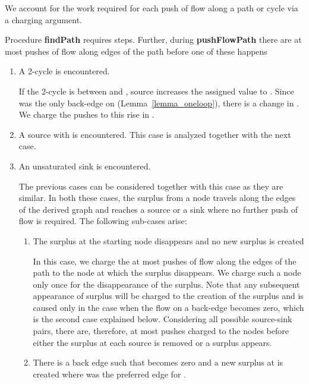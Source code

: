\documentclass[11pt]{article}
\newenvironment{proof}{\par\noindent{\bf Proof:}}{\mbox{}\hfill\\}
\newcounter{rem}
\newcommand{\ignore}[1]{ }
\begin{document}
\begin{proof}
We account for the work required for each push of flow along a path or cycle
via a charging argument. 
\ignore{
We will use the following key fact:\\
{\bf Fact 1:} If the flow on edge   at valuation
 is reduced to zero, 
then  occurs as a back edge only when 
the value of  rises to .\\
This fact follows due to the fact the  is monotonically non-decreasing.
Furthermore, flow can only be pushed on edge  at an increased valuation 
and an edge
is termed a back-edge when there is flow on the edge that has been pushed at a valuation of .
}
Procedure {\bf findPath} requires  steps.
Further, during {\bf pushFlowPath}
there are at most  pushes of flow along edges of the path
before one of these happens
\begin{enumerate}
\item
A 2-cycle  is encountered.

If the 2-cycle is between  and , source  increases the
assigned value  to . Since  was the only back-edge
on  (Lemma~\ref{lemma_oneloop}), there is a change in . We charge the  pushes 
to this rise in .

\item
A source with  is encountered. This case is analyzed together with the
next case.


\item
An unsaturated sink is encountered.

The previous cases can be considered together with this case as they are similar. In both 
these cases, the surplus from a node travels along the edges of the derived graph
and reaches a source or a sink where no further push of flow is required. The
following sub-cases arise:

\begin{enumerate}

\item
The surplus at the starting node disappears and no new surplus is created

In this case, we charge the  at most  pushes of flow along the edges of the path
to the node at which the surplus 
disappears. We charge such a node only once for the disappearance of the surplus. 
Note that any subsequent
appearance of surplus will be charged to the creation of the surplus and
is caused only in the case when the flow on 
a back-edge becomes zero, which is the second case explained below.  
Considering all possible source-sink pairs,
there are, therefore, at most  pushes charged to the nodes
before either the surplus at each source is removed or a surplus appears. 
\ignore{
Appearence of a surplus imples a change in the value
of  at the sink  where the flow on the back edge 
We call the sequence of steps between rises in
 as a phase. There is a change in some  at the 
end of the phase. We charge these  pushes to this rise
in . If no  rises the algorithm terminates.
}
\item
There is a back edge  such that  becomes zero and a new surplus
at  is created where  was the preferred edge for .


\end{enumerate}
\end{enumerate}
\end{proof}
\end{document}
